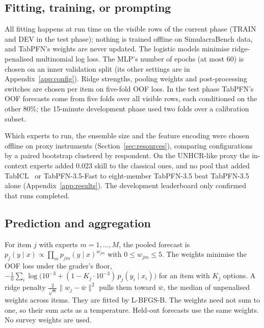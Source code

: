 \documentclass{article}
\begin{document}
\subsection{Fitting, training, or prompting}
All fitting happens at run time on the visible rows of the current phase (TRAIN and DEV in the
test phase); nothing is trained offline on SimulacraBench data, and TabPFN's weights are never
updated. The logistic models minimise ridge-penalised multinomial log loss. The MLP's number of
epochs (at most 60) is chosen on an inner validation split (its other settings are in
Appendix~\ref{app:config}). Ridge strengths, pooling weights and post-processing switches are
chosen per item on five-fold OOF loss. In the test phase TabPFN's OOF forecasts come from five
folds over all visible rows, each conditioned on the other 80\%; the 15-minute development phase
used two folds over a calibration subset.

Which experts to run, the ensemble size and the feature encoding were chosen offline on proxy
instruments (Section~\ref{sec:resources}), comparing configurations by a paired bootstrap
clustered by respondent. On the UNHCR-like proxy the in-context experts added 0.023 skill to the
classical ones, and no pool that added TabICL~\citep{qu2025tabicl} or TabPFN-3.5-Fast to
eight-member TabPFN-3.5 beat TabPFN-3.5 alone (Appendix~\ref{app:results}). The development
leaderboard only confirmed that runs completed.

\subsection{Prediction and aggregation}
\label{sec:pool}
For item $j$ with experts $m = 1, \dots, M$, the pooled forecast is
$p_j(y \mid x) \propto \prod_m p_{jm}(y \mid x)^{w_{jm}}$ with $0 \le w_{jm} \le 5$. The weights
minimise the OOF loss under the grader's floor,
$-\frac1n \sum_i \log\big(10^{-3} + (1 - K_j \cdot 10^{-3})\, p_j(y_i \mid x_i)\big)$
for an item with $K_j$ options. A ridge penalty $\frac{2}{\sqrt n}\lVert w_j - \bar w\rVert^2$
pulls them toward $\bar w$, the median of unpenalised weights across items. They are fitted by
L-BFGS-B. The weights need not sum to one, so their sum acts as a temperature. Held-out
forecasts use the same weights. No survey weights are used.
\end{document}
